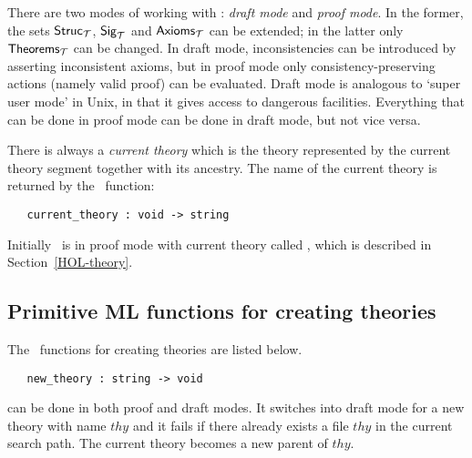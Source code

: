 There are two modes of working with \HOL: {\it draft mode\/} and {\it proof
mode\/}.
In the former, the sets ${\sf Struc}_{\cal T}$, ${\sf Sig}_{\cal T}$
and ${\sf Axioms}_{\cal T}$ can be extended; in the latter only ${\sf
Theorems}_{\cal T}$ can be changed. In draft mode, inconsistencies can be
introduced by asserting inconsistent axioms, but in proof mode only
consistency-preserving actions (namely valid proof) can be evaluated. Draft mode is
analogous to `super user mode' in Unix, in that it gives access to dangerous
facilities. Everything that can be done in proof mode can be done in draft
mode, but not vice versa.

There is always a {\it current theory\/} which is the theory represented by
the current theory segment together with its ancestry. The name of the current
theory is returned by the \ML\ function:

\begin{boxed}
\begin{verbatim}
   current_theory : void -> string
\end{verbatim}\end{boxed}

Initially \HOL\ is in proof mode with current
theory called , which is described in Section~\ref{HOL-theory}.

\subsection{Primitive ML functions for creating theories}
\label{theoryprims}

The \ML\ functions for creating theories are listed below.

\begin{boxed}
\begin{verbatim}
   new_theory : string -> void
\end{verbatim}\end{boxed}

\noindent {} can be done in both
proof and
draft modes. It
switches into draft mode for a new theory with name $thy$ and it fails if
there already exists a file $thy$ in the current search path. The
current theory becomes a new parent of $thy$.



